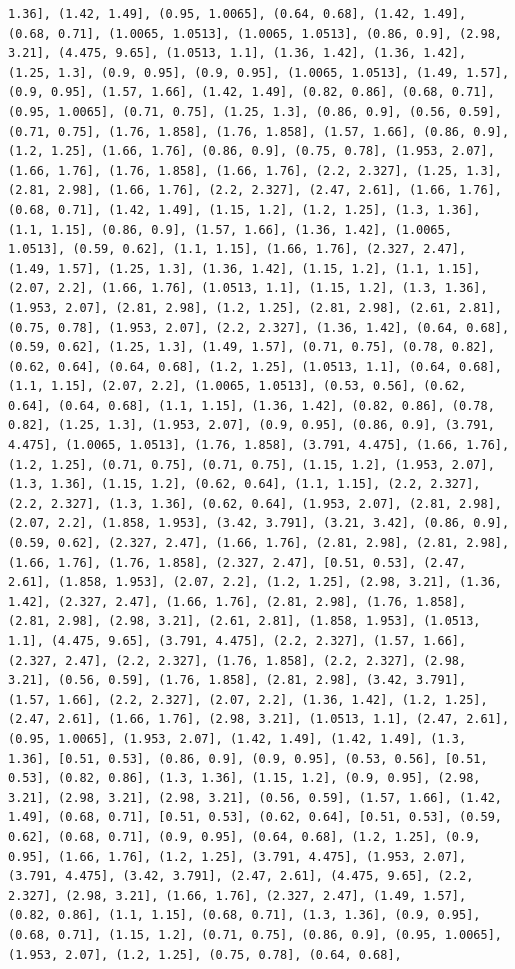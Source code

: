 \documentclass[12pt,fleqn]{article}\usepackage{../common}
\begin{document}
\begin{verbatim}
1.36], (1.42, 1.49], (0.95, 1.0065], (0.64, 0.68], (1.42, 1.49], (0.68, 0.71], (1.0065, 1.0513], (1.0065, 1.0513], (0.86, 0.9], (2.98, 3.21], (4.475, 9.65], (1.0513, 1.1], (1.36, 1.42], (1.36, 1.42], (1.25, 1.3], (0.9, 0.95], (0.9, 0.95], (1.0065, 1.0513], (1.49, 1.57], (0.9, 0.95], (1.57, 1.66], (1.42, 1.49], (0.82, 0.86], (0.68, 0.71], (0.95, 1.0065], (0.71, 0.75], (1.25, 1.3], (0.86, 0.9], (0.56, 0.59], (0.71, 0.75], (1.76, 1.858], (1.76, 1.858], (1.57, 1.66], (0.86, 0.9], (1.2, 1.25], (1.66, 1.76], (0.86, 0.9], (0.75, 0.78], (1.953, 2.07], (1.66, 1.76], (1.76, 1.858], (1.66, 1.76], (2.2, 2.327], (1.25, 1.3], (2.81, 2.98], (1.66, 1.76], (2.2, 2.327], (2.47, 2.61], (1.66, 1.76], (0.68, 0.71], (1.42, 1.49], (1.15, 1.2], (1.2, 1.25], (1.3, 1.36], (1.1, 1.15], (0.86, 0.9], (1.57, 1.66], (1.36, 1.42], (1.0065, 1.0513], (0.59, 0.62], (1.1, 1.15], (1.66, 1.76], (2.327, 2.47], (1.49, 1.57], (1.25, 1.3], (1.36, 1.42], (1.15, 1.2], (1.1, 1.15], (2.07, 2.2], (1.66, 1.76], (1.0513, 1.1], (1.15, 1.2], (1.3, 1.36], (1.953, 2.07], (2.81, 2.98], (1.2, 1.25], (2.81, 2.98], (2.61, 2.81], (0.75, 0.78], (1.953, 2.07], (2.2, 2.327], (1.36, 1.42], (0.64, 0.68], (0.59, 0.62], (1.25, 1.3], (1.49, 1.57], (0.71, 0.75], (0.78, 0.82], (0.62, 0.64], (0.64, 0.68], (1.2, 1.25], (1.0513, 1.1], (0.64, 0.68], (1.1, 1.15], (2.07, 2.2], (1.0065, 1.0513], (0.53, 0.56], (0.62, 0.64], (0.64, 0.68], (1.1, 1.15], (1.36, 1.42], (0.82, 0.86], (0.78, 0.82], (1.25, 1.3], (1.953, 2.07], (0.9, 0.95], (0.86, 0.9], (3.791, 4.475], (1.0065, 1.0513], (1.76, 1.858], (3.791, 4.475], (1.66, 1.76], (1.2, 1.25], (0.71, 0.75], (0.71, 0.75], (1.15, 1.2], (1.953, 2.07], (1.3, 1.36], (1.15, 1.2], (0.62, 0.64], (1.1, 1.15], (2.2, 2.327], (2.2, 2.327], (1.3, 1.36], (0.62, 0.64], (1.953, 2.07], (2.81, 2.98], (2.07, 2.2], (1.858, 1.953], (3.42, 3.791], (3.21, 3.42], (0.86, 0.9], (0.59, 0.62], (2.327, 2.47], (1.66, 1.76], (2.81, 2.98], (2.81, 2.98], (1.66, 1.76], (1.76, 1.858], (2.327, 2.47], [0.51, 0.53], (2.47, 2.61], (1.858, 1.953], (2.07, 2.2], (1.2, 1.25], (2.98, 3.21], (1.36, 1.42], (2.327, 2.47], (1.66, 1.76], (2.81, 2.98], (1.76, 1.858], (2.81, 2.98], (2.98, 3.21], (2.61, 2.81], (1.858, 1.953], (1.0513, 1.1], (4.475, 9.65], (3.791, 4.475], (2.2, 2.327], (1.57, 1.66], (2.327, 2.47], (2.2, 2.327], (1.76, 1.858], (2.2, 2.327], (2.98, 3.21], (0.56, 0.59], (1.76, 1.858], (2.81, 2.98], (3.42, 3.791], (1.57, 1.66], (2.2, 2.327], (2.07, 2.2], (1.36, 1.42], (1.2, 1.25], (2.47, 2.61], (1.66, 1.76], (2.98, 3.21], (1.0513, 1.1], (2.47, 2.61], (0.95, 1.0065], (1.953, 2.07], (1.42, 1.49], (1.42, 1.49], (1.3, 1.36], [0.51, 0.53], (0.86, 0.9], (0.9, 0.95], (0.53, 0.56], [0.51, 0.53], (0.82, 0.86], (1.3, 1.36], (1.15, 1.2], (0.9, 0.95], (2.98, 3.21], (2.98, 3.21], (2.98, 3.21], (0.56, 0.59], (1.57, 1.66], (1.42, 1.49], (0.68, 0.71], [0.51, 0.53], (0.62, 0.64], [0.51, 0.53], (0.59, 0.62], (0.68, 0.71], (0.9, 0.95], (0.64, 0.68], (1.2, 1.25], (0.9, 0.95], (1.66, 1.76], (1.2, 1.25], (3.791, 4.475], (1.953, 2.07], (3.791, 4.475], (3.42, 3.791], (2.47, 2.61], (4.475, 9.65], (2.2, 2.327], (2.98, 3.21], (1.66, 1.76], (2.327, 2.47], (1.49, 1.57], (0.82, 0.86], (1.1, 1.15], (0.68, 0.71], (1.3, 1.36], (0.9, 0.95], (0.68, 0.71], (1.15, 1.2], (0.71, 0.75], (0.86, 0.9], (0.95, 1.0065], (1.953, 2.07], (1.2, 1.25], (0.75, 0.78], (0.64, 0.68], 
\end{verbatim}
\end{document}
